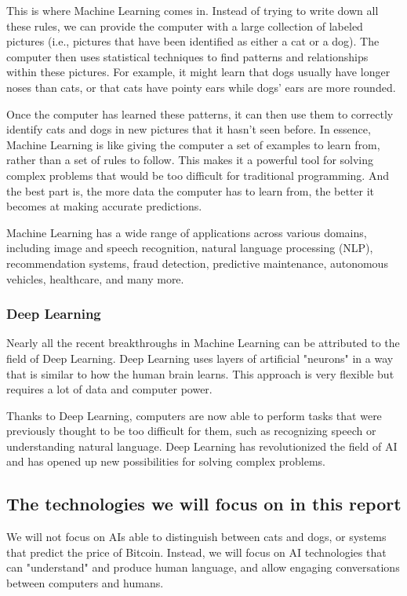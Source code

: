 \documentclass{article}
\begin{document}
This is where Machine Learning comes in. Instead of trying to write down
all these rules, we can provide the computer with a large collection of
labeled pictures (i.e., pictures that have been identified as either a cat
or a dog). The computer then uses statistical techniques to find patterns
and relationships within these pictures. For example, it might learn that
dogs usually have longer noses than cats, or that cats have pointy ears
while dogs' ears are more rounded.

Once the computer has learned these patterns, it can then use them
to correctly identify cats and dogs in new pictures that it hasn't
seen before. In essence, Machine Learning is like giving the computer
a set of examples to learn from, rather than a set of rules to follow.
This makes it a powerful tool for solving complex problems that would
be too difficult for traditional programming. And the best part is,
the more data the computer has to learn from, the better it becomes
at making accurate predictions.

Machine Learning has a wide range of applications across various
domains, including image and speech recognition, natural language
processing (NLP), recommendation systems, fraud detection, predictive
maintenance, autonomous vehicles, healthcare, and many more.

\subsubsection{Deep Learning}

Nearly all the recent breakthroughs in Machine Learning can be attributed
to the field of Deep Learning. Deep Learning uses layers of artificial
"neurons" in a way that is similar to how the human brain learns.
This approach is very flexible but requires a lot of data and computer
power.

Thanks to Deep Learning, computers are now able to perform tasks that
were previously thought to be too difficult for them, such as recognizing
speech or understanding natural language. Deep Learning has revolutionized
the field of AI and has opened up new possibilities for solving complex
problems.

\subsection{The technologies we will focus on in this report}

We will not focus on AIs able to distinguish between cats and dogs, or systems that predict the price of Bitcoin. Instead, we will focus on AI technologies that can "understand" and produce human language, and allow engaging conversations between computers and humans.
\end{document}
